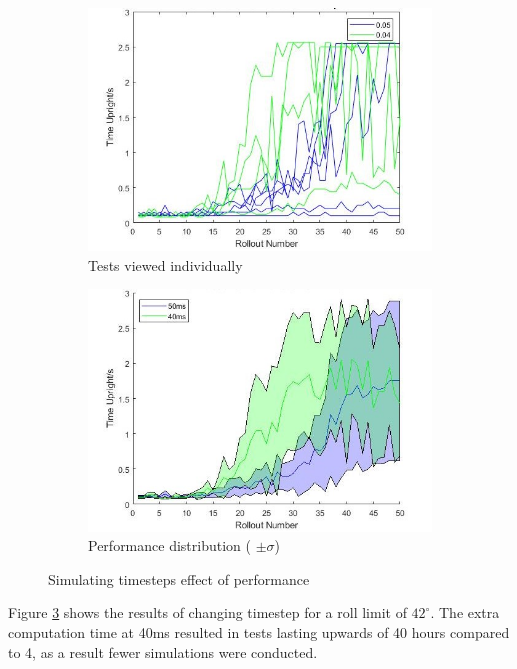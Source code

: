 \documentclass[twoside,twocolumn,12pt]{article}
\begin{document}
\begin{figure}[h!]
  \centering
  \begin{subfigure}[t]{0.5\textwidth}
    \includegraphics[width=\linewidth]{all_ts}
   \caption{Tests viewed individually}
  \label{fig:allts}
  \end{subfigure}
  \newline
  \begin{subfigure}[t]{0.5\textwidth}
    \includegraphics[width=\linewidth]{disp_ts}
    \caption{Performance distribution ( $\pm \sigma$)}
  \label{fig:dispts}
  \end{subfigure}
  \caption{Simulating timesteps effect of performance}
  \label{fig:st}
\end{figure}
Figure \ref{fig:st} shows the results of changing timestep for a roll limit of $42^{\circ}$. The extra computation time at 40ms resulted in tests lasting upwards of 40 hours compared to 4, as a result fewer simulations were conducted.
\end{document}
